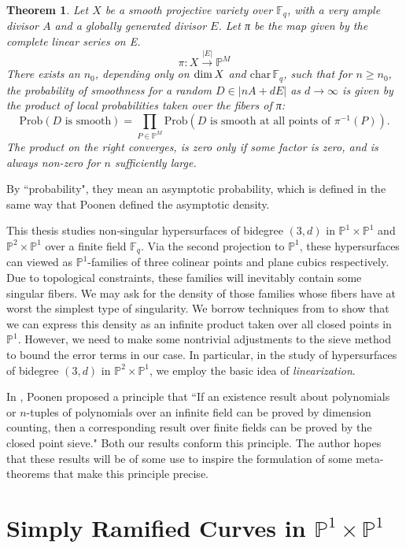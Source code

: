 \documentclass[12pt]{article}
\theoremstyle{plain}
\newtheorem{theorem}[equation]{Theorem}
\theoremstyle{definition}
\newcommand{\IF}{\mathbb{F}}
\newcommand{\IP}{\mathbb{P}}
\renewcommand\dim{{\rm dim\,}}
\newcommand{\<}{\langle}
\renewcommand{\>}{\rangle}
\newcommand{\Prob}{\mathrm{Prob}}
\begin{document}
\begin{theorem}
Let $X$ be a smooth projective variety over $\IF_q$, with a
very ample divisor $A$ and a globally generated divisor $E$. Let π be the map given by the
complete linear series on E.
$$ \pi : X \stackrel{|E|}{\to} \IP^M $$
There exists an $n_0$, depending only on $\dim X$ and $\mathrm{char\,} \IF_q$, such that for $n \ge n_0$, the
probability of smoothness for a random $D \in |nA + dE|$ as $d \to \infty$ is given by the product of local probabilities taken over the fibers of π:
$$ \Prob(D \text{ is smooth}) = \prod_{P \in \IP^M} \Prob(D \text{ is smooth at all points of } \pi^{-1}(P)). $$
The product on the right converges, is zero only if some factor is zero, and is always non-zero for $n$ sufficiently large.
\end{theorem}

By ``probability", they mean an asymptotic probability, which is defined in the same way that Poonen defined the asymptotic density. 

This thesis studies non-singular hypersurfaces of bidegree $(3, d)$ in $\IP^1 \times \IP^1$ and $\IP^2 \times \IP^1$ over a finite field $\IF_q$. Via the second projection to $\IP^1$, these hypersurfaces can viewed as $\IP^1$-families of three colinear points and plane cubics respectively. Due to topological constraints, these families will inevitably contain some singular fibers. We may ask for the density of those families whose fibers have at worst the simplest type of singularity. We borrow techniques from \cite{Wood} to show that we can express this density as an infinite product taken over all closed points in $\IP^1$. However, we need to make some nontrivial adjustments to the sieve method to bound the error terms in our case. In particular, in the study of hypersurfaces of bidegree $(3, d)$ in $\IP^2 \times \IP^1$, we employ the basic idea of \textit{linearization}.

In \cite{expository}, Poonen proposed a principle that ``If an existence result about polynomials
or $n$-tuples of polynomials over an infinite field can be proved by dimension counting,
then a corresponding result over finite fields can be proved by the closed point sieve." Both our results conform this principle. The author hopes that these results will be of some use to inspire the formulation of some meta-theorems that make this principle precise.  


\section{Simply Ramified Curves in $\IP^1 \times \IP^1$}
\label{simplify-ramified}
\end{document}

